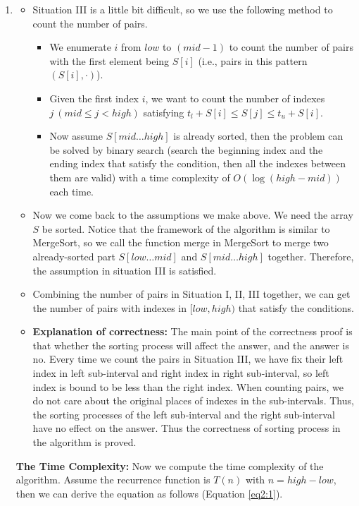 \documentclass[12pt,a4paper]{article}
\makeatletter
\newtheorem*{solution}{Solution}
\theoremstyle{definition}
\renewenvironment{solution}[1][Solution] {\par\pushQED{\qed}\normalfont\topsep6\p@\@plus6\p@\relax\trivlist\item[\hskip\labelsep\bfseries#1\@addpunct{.}]\ignorespaces}{\popQED\endtrivlist\@endpefalse} \makeatother
\makeatother
\begin{document}
\begin{enumerate}
\begin{solution}
\begin{itemize}
        \item Situation III is a little bit difficult, so we use the following method to count the number of pairs.
        \begin{itemize}
        \item We enumerate $i$ from $low$ to $(mid - 1)$ to count the number of pairs with the first element being $S[i]$ (i.e., pairs in this pattern $(S[i], \cdot)$).
        \item Given the first index $i$, we want to count the number of indexes $j\ (mid \leq j < high)$ satisfying $t_l + S[i] \leq S[j] \leq t_u + S[i]$.
        \item Now assume $S[mid \ldots high]$ is already sorted, then the problem can be solved by binary search (search the beginning index and the ending index that satisfy the condition, then all the indexes between them are valid) with a time complexity of $O(\log{(high - mid)})$ each time.
        \end{itemize}
        \item Now we come back to the assumptions we make above. We need the array $S$ be sorted. Notice that the framework of the algorithm is similar to MergeSort, so we call the function merge in MergeSort to merge two already-sorted part $S[low \ldots mid]$ and $S[mid \ldots high]$ together. Therefore, the assumption in situation III is satisfied.
        \item Combining the number of pairs in Situation I, II, III together, we can get the number of pairs with indexes in $[low, high)$ that satisfy the conditions.
        \item \textbf{Explanation of correctness:} The main point of the correctness proof is that whether the sorting process will affect the answer, and the answer is no. Every time we count the pairs in Situation III, we have fix their left index in left sub-interval and right index in right sub-interval, so left index is bound to be less than the right index. When counting pairs, we do not care about the original places of indexes in the sub-intervals. Thus, the sorting processes of the left sub-interval and the right sub-interval have no effect on the answer. Thus the correctness of sorting process in the algorithm is proved.
        \end{itemize}
        \textbf{The Time Complexity:} Now we compute the time complexity of the algorithm. Assume the recurrence function is $T(n)$ with $n = high - low$, then we can derive the equation as follows (Equation \eqref{eq2:1}).
        \begin{equation}

\end{equation}
\end{solution}
\end{enumerate}
\end{document}
